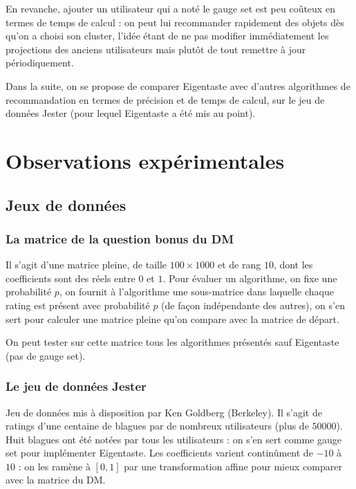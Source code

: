 \documentclass[11pt, openany, a4paper]{article}
\begin{document}
		En revanche, ajouter un utilisateur qui a noté le gauge set est peu coûteux en termes de temps de calcul : on peut lui recommander rapidement des objets dès qu'on a choisi son cluster, l'idée étant de ne pas modifier immédiatement les projections des anciens utilisateurs mais plutôt de tout remettre à jour périodiquement.
		
		Dans la suite, on se propose de comparer Eigentaste avec d'autres algorithmes de recommandation en termes de précision et de temps de calcul, sur le jeu de données Jester (pour lequel Eigentaste a été mis au point).
		
		
		
		
\section{Observations expérimentales}
	\subsection{Jeux de données}
	\subsubsection{La matrice de la question bonus du DM}
		
		Il s'agit d'une matrice pleine, de taille $100 \times 1000$ et de rang $10$, dont les coefficients sont des réels entre $0$ et $1$. Pour évaluer un algorithme, on fixe une probabilité $p$, on fournit à l'algorithme une sous-matrice dans laquelle chaque rating est présent avec probabilité $p$ (de façon indépendante des autres), on s'en sert pour calculer une matrice pleine qu'on compare avec la matrice de départ.
		
		On peut tester sur cette matrice tous les algorithmes présentés sauf Eigentaste (pas de gauge set).
		
	\subsubsection{Le jeu de données Jester}
		Jeu de données mis à disposition par Ken Goldberg (Berkeley). Il s'agit de ratings d'une centaine de blagues par de nombreux utilisateurs (plus de $50 000$). Huit blagues ont été notées par tous les utilisateurs : on s'en sert comme gauge set pour implémenter Eigentaste. Les coefficients varient continûment de $-10$ à $10$ : on les ramène à $[0,1]$ par une transformation affine pour mieux comparer avec la matrice du DM.
		
\end{document}

